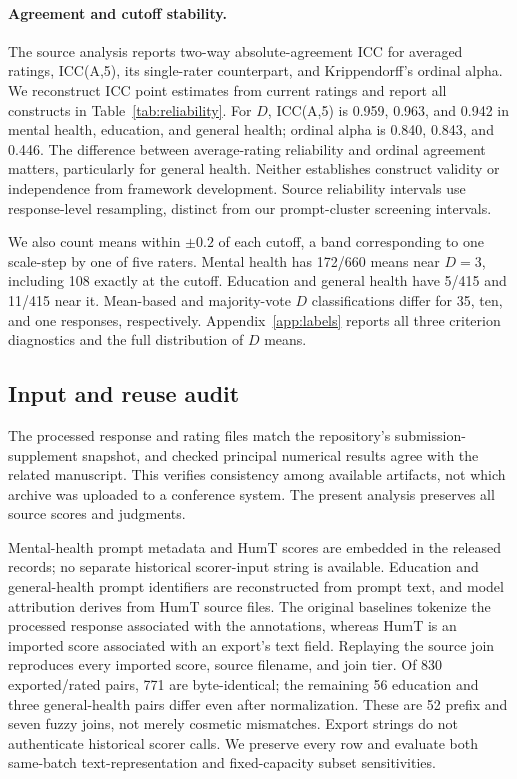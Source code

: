 \documentclass[manuscript,screen,review,anonymous]{acmart}
\begin{document}
\paragraph{Agreement and cutoff stability.}
The source analysis reports two-way absolute-agreement ICC for averaged ratings, ICC(A,5), its single-rater counterpart, and Krippendorff's ordinal alpha. We reconstruct ICC point estimates from current ratings and report all constructs in Table~\ref{tab:reliability}. For $D$, ICC(A,5) is 0.959, 0.963, and 0.942 in mental health, education, and general health; ordinal alpha is 0.840, 0.843, and 0.446. The difference between average-rating reliability and ordinal agreement matters, particularly for general health. Neither establishes construct validity or independence from framework development. Source reliability intervals use response-level resampling, distinct from our prompt-cluster screening intervals.

We also count means within $\pm0.2$ of each cutoff, a band corresponding to one scale-step by one of five raters. Mental health has 172/660 means near $D=3$, including 108 exactly at the cutoff. Education and general health have 5/415 and 11/415 near it. Mean-based and majority-vote $D$ classifications differ for 35, ten, and one responses, respectively. Appendix~\ref{app:labels} reports all three criterion diagnostics and the full distribution of $D$ means.

\subsection{Input and reuse audit}
The processed response and rating files match the repository's submission-supplement snapshot, and checked principal numerical results agree with the related manuscript. This verifies consistency among available artifacts, not which archive was uploaded to a conference system. The present analysis preserves all source scores and judgments.

Mental-health prompt metadata and HumT scores are embedded in the released records; no separate historical scorer-input string is available. Education and general-health prompt identifiers are reconstructed from prompt text, and model attribution derives from HumT source files. The original baselines tokenize the processed response associated with the annotations, whereas HumT is an imported score associated with an export's text field. Replaying the source join reproduces every imported score, source filename, and join tier. Of 830 exported/rated pairs, 771 are byte-identical; the remaining 56 education and three general-health pairs differ even after normalization. These are 52 prefix and seven fuzzy joins, not merely cosmetic mismatches. Export strings do not authenticate historical scorer calls. We preserve every row and evaluate both same-batch text-representation and fixed-capacity subset sensitivities.
\end{document}
